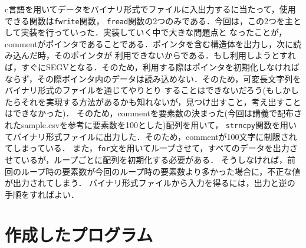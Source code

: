 \documentclass[a4paper,11pt]{jarticle}
\begin{document}
c言語を用いてデータをバイナリ形式でファイルに入出力するに当たって，使用できる関数は\verb|fwrite|関数，
\verb|fread|関数の2つのみである．今回は，この2つを主として実装を行っていった．実装していく中で大きな問題点と
なったことが，commentがポインタであることである．ポインタを含む構造体を出力し，次に読み込んだ時，そのポインタが
利用できないからである．もし利用しようとすれば，すぐにSEGVとなる．そのため，利用する際はポインタを初期化しなければ
ならず，その際ポインタ内のデータは読み込めない．そのため，可変長文字列をバイナリ形式のファイルを通じてやりとり
することはできないだろう(もしかしたらそれを実現する方法があるかも知れないが，見つけ出すこと，考え出すことはできなかった)．
そのため，commentを要素数の決まった(今回は講義で配布されたsample.csvを参考に要素数を100とした)配列を用いて，
\verb|strncpy|関数を用いてバイナリ形式ファイルに出力した．そのため，commentが100文字に制限されてしまっている．
また，\verb|for|文を用いてループさせて，すべてのデータを出力させているが，ループごとに配列を初期化する必要がある．
そうしなければ，前回のループ時の要素数が今回のループ時の要素数より多かった場合に，不正な値が出力されてしまう．
バイナリ形式ファイルから入力を得るには，出力と逆の手順をすればよい．

\section{作成したプログラム}
\end{document}

